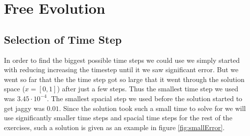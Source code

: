 \documentclass[11pt]{article}
\begin{document}
\section{Free Evolution}
\subsection{Selection of Time Step}
In order to find the biggest possible time steps we could use we simply started with reducing increasing the timestep until it we saw significant error. But we went so far that the the time step got so large that it went through the solution space ($x=[0,1]$) after just a few steps. Thus the smallest time step we used was  $3.45\cdot 10^{-4}$. The smallest spacial step we used before the solution started to get jaggy was $0.01$. Since the solution took such a small time to solve for we will use significantly smaller time steps and spacial time steps for the rest of the exercises, such a solution is given as an example in figure \ref{fig:smallError}.
\end{document}
